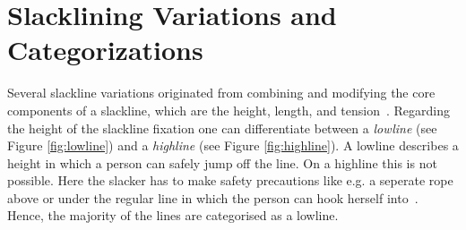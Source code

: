 \section{Slacklining Variations and Categorizations}\label{3_2_slacklineVariations}
Several slackline variations originated from combining and modifying the core components of a slackline, which are the height, length, and tension~\cite{Kleindl2011-bl, MillerMauser2013-sl, Thomann2017-ab}.
Regarding the height of the slackline fixation one can differentiate between a \textit{lowline} (see Figure \ref{fig:lowline}) and a \textit{highline} (see Figure \ref{fig:highline}).
A lowline describes a height in which a person can safely jump off the line.
On a highline this is not possible.
Here the slacker has to make safety precautions like e.g. a seperate rope above or under the regular line in which the person can hook herself into~\cite{Kleindl2011-bl}. Hence, the majority of the lines are categorised as a lowline.
